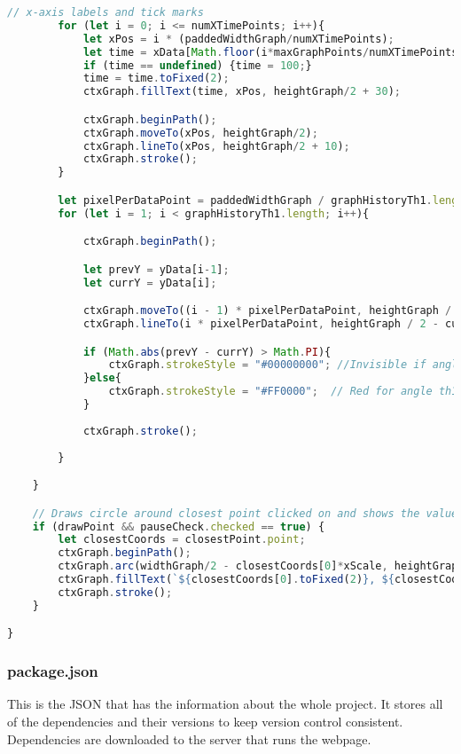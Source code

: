 \documentclass[12pt]{article}
\begin{document}
\begin{lstlisting}[language=JavaScript]
        // x-axis labels and tick marks
        for (let i = 0; i <= numXTimePoints; i++){
            let xPos = i * (paddedWidthGraph/numXTimePoints);
            let time = xData[Math.floor(i*maxGraphPoints/numXTimePoints)]/100;
            if (time == undefined) {time = 100;}
            time = time.toFixed(2);
            ctxGraph.fillText(time, xPos, heightGraph/2 + 30);

            ctxGraph.beginPath();
            ctxGraph.moveTo(xPos, heightGraph/2);
            ctxGraph.lineTo(xPos, heightGraph/2 + 10);
            ctxGraph.stroke();
        }

        let pixelPerDataPoint = paddedWidthGraph / graphHistoryTh1.length;
        for (let i = 1; i < graphHistoryTh1.length; i++){

            ctxGraph.beginPath();

            let prevY = yData[i-1];
            let currY = yData[i];

            ctxGraph.moveTo((i - 1) * pixelPerDataPoint, heightGraph / 2 - prevY * yScale);
            ctxGraph.lineTo(i * pixelPerDataPoint, heightGraph / 2 - currY * yScale);

            if (Math.abs(prevY - currY) > Math.PI){
                ctxGraph.strokeStyle = "#00000000"; //Invisible if angle greater than 2PI
            }else{
                ctxGraph.strokeStyle = "#FF0000";  // Red for angle th1
            }
            
            ctxGraph.stroke();
    
        }

    }

    // Draws circle around closest point clicked on and shows the values of the point
    if (drawPoint && pauseCheck.checked == true) {
        let closestCoords = closestPoint.point;
        ctxGraph.beginPath();
        ctxGraph.arc(widthGraph/2 - closestCoords[0]*xScale, heightGraph / 2 - closestCoords[1] * yScale, 10, 0, 2* Math.PI);
        ctxGraph.fillText(`${closestCoords[0].toFixed(2)}, ${closestCoords[1].toFixed(2)}`, widthGraph/2 - closestCoords[0]*xScale + 10, heightGraph / 2 - closestCoords[1] * yScale - 10);
        ctxGraph.stroke();
    }

}
\end{lstlisting}



\subsubsection{package.json}
This is the JSON that has the information about the whole project. It stores all of the dependencies and their versions to keep version control consistent. Dependencies are downloaded to the server that runs the webpage.
\end{document}
